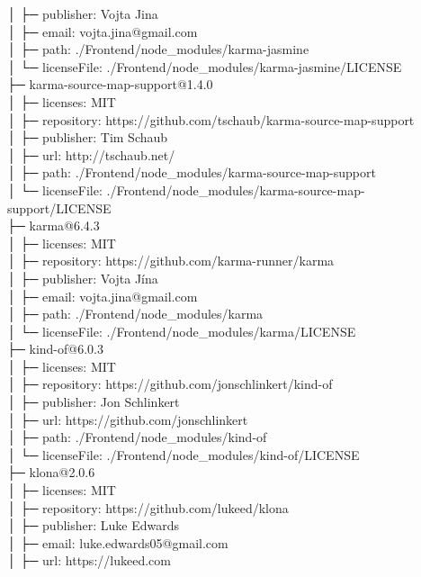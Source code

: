\documentclass[
    paper=a4,
    twoside=false,
    parskip=half,
    listof=entryprefix,
    listof=totoc,
    index=totoc,
    bibliography=totoc,
    headsepline,
]{scrbook}
\begin{document}
    │  ├─ publisher: Vojta Jina\\
    │  ├─ email: vojta.jina@gmail.com\\
    │  ├─ path: ./Frontend/node\_modules/karma-jasmine\\
    │  └─ licenseFile: ./Frontend/node\_modules/karma-jasmine/LICENSE\\
    ├─ karma-source-map-support@1.4.0\\
    │  ├─ licenses: MIT\\
    │  ├─ repository: https://github.com/tschaub/karma-source-map-support\\
    │  ├─ publisher: Tim Schaub\\
    │  ├─ url: http://tschaub.net/\\
    │  ├─ path: ./Frontend/node\_modules/karma-source-map-support\\
    │  └─ licenseFile: ./Frontend/node\_modules/karma-source-map-support/LICENSE\\
    ├─ karma@6.4.3\\
    │  ├─ licenses: MIT\\
    │  ├─ repository: https://github.com/karma-runner/karma\\
    │  ├─ publisher: Vojta Jína\\
    │  ├─ email: vojta.jina@gmail.com\\
    │  ├─ path: ./Frontend/node\_modules/karma\\
    │  └─ licenseFile: ./Frontend/node\_modules/karma/LICENSE\\
    ├─ kind-of@6.0.3\\
    │  ├─ licenses: MIT\\
    │  ├─ repository: https://github.com/jonschlinkert/kind-of\\
    │  ├─ publisher: Jon Schlinkert\\
    │  ├─ url: https://github.com/jonschlinkert\\
    │  ├─ path: ./Frontend/node\_modules/kind-of\\
    │  └─ licenseFile: ./Frontend/node\_modules/kind-of/LICENSE\\
    ├─ klona@2.0.6\\
    │  ├─ licenses: MIT\\
    │  ├─ repository: https://github.com/lukeed/klona\\
    │  ├─ publisher: Luke Edwards\\
    │  ├─ email: luke.edwards05@gmail.com\\
    │  ├─ url: https://lukeed.com\\
\end{document}
